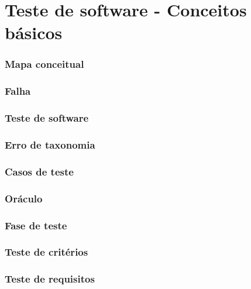 \documentclass[utf8, usepdftitle=false, svgnames, color={table, fixpdftex, hyperref, fixinclude, xcdraw}, t, brazil]{beamer}
\begin{document}
 \part{Teste de software - Conceitos básicos}
 
 \section{Mapa conceitual}
 
 
 \section{Falha}
 
 
 \section{Teste de software}
 
 
 \section{Erro de taxonomia}
 
 
 \section{Casos de teste}
 
 
 \section{Oráculo}
 
 
 \section{Fase de teste}
 
 
 \section{Teste de critérios}
 
 
 \section{Teste de requisitos}
 
\end{document}
